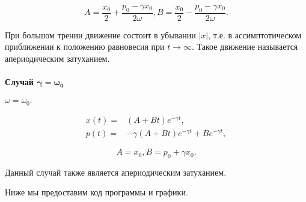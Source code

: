 \documentclass[11pt]{article}
\begin{document}
\[ A = \dfrac{x_0}{2} + \dfrac{p_0 - \gamma x_0}{2 \omega}, 
B = \dfrac{x_0}{2} - \dfrac{p_0 - \gamma x_0}{2 \omega}. \]

При большом трении движение состоит в убывании \(|x|\), т.е. в
ассимптотическом приближении к положению равновесия при
\(t \longrightarrow \infty\). Такое движение называется апериодическим
затуханием.

\hypertarget{ux441ux43bux443ux447ux430ux439-mathbfgamma-omega_0-2}{%
\paragraph{\texorpdfstring{Случай
\(\mathbf{\gamma = \omega_0}\)}{Случай \textbackslash mathbf\{\textbackslash gamma = \textbackslash omega\_0\}}}\label{ux441ux43bux443ux447ux430ux439-mathbfgamma-omega_0-2}}

\(\omega = \omega_0.\)

\begin{align}
    x(t) = & (A + B t) e^{-\gamma t}, \\
    p(t) = & -\gamma (A + B t) e^{-\gamma t} + B e^{-\gamma t},
\end{align}

\[ A = x_0, 
B = p_0 + \gamma x_0. \]

Данный случай также является апериодическим затуханием.

Ниже мы предоставим код программы и графики.
\end{document}
